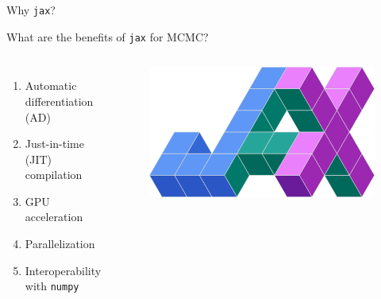 \documentclass[usenames,dvipsnames,t]{beamer}
\begin{document}
\begin{frame}{Why \texttt{jax}?}

  \def\x{3.5mm}

  \begin{tcolorbox}[colback=blue!10, boxrule=0pt]
    What are the benefits of \texttt{jax} for MCMC?
  \end{tcolorbox}

\begin{columns}
  \begin{enumerate}
    \item Automatic differentiation (AD)
    
    \vspace{\x}

    \item Just-in-time (JIT) compilation
    
    \vspace{\x}
    
    \item GPU acceleration
    
    \vspace{\x}
    
    \item Parallelization
    
    
    
    \vspace{\x}
    
    \item Interoperability with \texttt{numpy}
  \end{enumerate}
  \begin{figure}
    \includegraphics[width=\textwidth]{Figures/jax.png}
  \end{figure}
\end{columns}
  
\end{frame}
\end{document}
